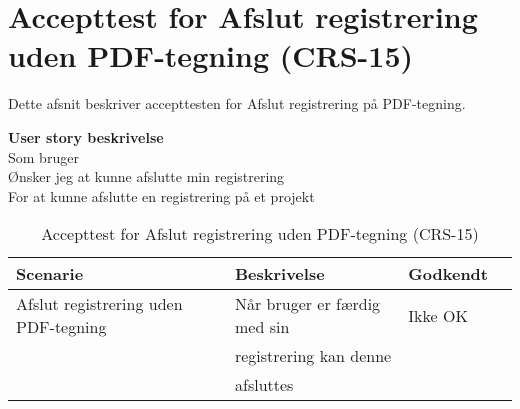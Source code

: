 \section{Accepttest for Afslut registrering uden PDF-tegning (CRS-15)}
Dette afsnit beskriver accepttesten for Afslut registrering på PDF-tegning.

\textbf{User story beskrivelse} \\
Som bruger \\
Ønsker jeg at kunne afslutte min registrering \\
For at kunne afslutte en registrering på et projekt

\begin{table}[H]
	\centering
	\begin{tabular}{|ll|l|ll|} \hline
		\textbf{Scenarie} &  & \textbf{Beskrivelse}&  \textbf{Godkendt}&  \\ \hline
		Afslut registrering uden PDF-tegning&  &  Når bruger er færdig med sin &  Ikke OK&  \\
		& & registrering kan denne& & \\
		& & afsluttes& & \\ \hline
	\end{tabular}
	\caption{Accepttest for Afslut registrering uden PDF-tegning (CRS-15)}
	\label{AcceptAfslutUdenPDF}
\end{table}